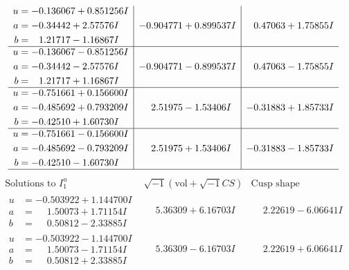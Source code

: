 \documentclass[1p]{elsarticle_modified}
\theoremstyle{definition}
\newcommand{\I}{\sqrt{-1}}
\begin{document}
$$\begin{array}{c|c|c}
\begin{aligned}
u &= -0.136067 + 0.851256 I \\
a &= -0.34442 + 2.57576 I \\
b &= \phantom{-}1.21717 - 1.16867 I\end{aligned}
 & -0.904771 + 0.899537 I & \phantom{-}0.47063 + 1.75855 I \\ \hline\begin{aligned}
u &= -0.136067 - 0.851256 I \\
a &= -0.34442 - 2.57576 I \\
b &= \phantom{-}1.21717 + 1.16867 I\end{aligned}
 & -0.904771 - 0.899537 I & \phantom{-}0.47063 - 1.75855 I \\ \hline\begin{aligned}
u &= -0.751661 + 0.156600 I \\
a &= -0.485692 + 0.793209 I \\
b &= -0.42510 + 1.60730 I\end{aligned}
 & \phantom{-}2.51975 - 1.53406 I & -0.31883 + 1.85733 I \\ \hline\begin{aligned}
u &= -0.751661 - 0.156600 I \\
a &= -0.485692 - 0.793209 I \\
b &= -0.42510 - 1.60730 I\end{aligned}
 & \phantom{-}2.51975 + 1.53406 I & -0.31883 - 1.85733 I\\
 \hline 
 \end{array}$$\newpage$$\begin{array}{c|c|c}  
\text{Solutions to }I^u_{1}& \I (\text{vol} + \sqrt{-1}CS) & \text{Cusp shape}\\
 \hline 
\begin{aligned}
u &= -0.503922 + 1.144700 I \\
a &= \phantom{-}1.50073 + 1.71154 I \\
b &= \phantom{-}0.50812 - 2.33885 I\end{aligned}
 & \phantom{-}5.36309 + 6.16703 I & \phantom{-}2.22619 - 6.06641 I \\ \hline\begin{aligned}
u &= -0.503922 - 1.144700 I \\
a &= \phantom{-}1.50073 - 1.71154 I \\
b &= \phantom{-}0.50812 + 2.33885 I\end{aligned}
 & \phantom{-}5.36309 - 6.16703 I & \phantom{-}2.22619 + 6.06641 I \\ \hline\begin{aligned}

\end{aligned}
\end{array}$$
\end{document}
